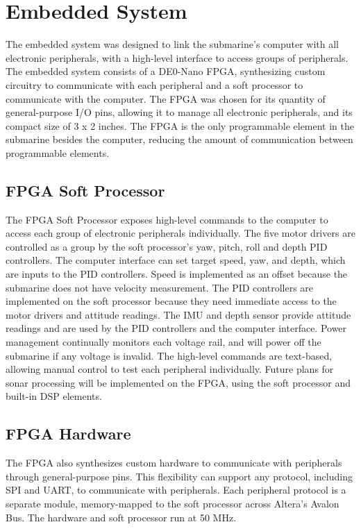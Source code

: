 \section{Embedded System}

The embedded system was designed to link the submarine's computer with all
electronic peripherals, with a high-level interface to access groups of peripherals.
The embedded system consists of a DE0-Nano FPGA, synthesizing custom circuitry to
communicate with each peripheral and a soft processor to communicate with the computer. The FPGA was chosen
for its quantity of general-purpose I/O pins, allowing it to manage all electronic peripherals,
and its compact size of 3 x 2 inches. The FPGA is the only programmable element in the submarine
besides the computer, reducing the amount of communication between programmable elements.

\subsection{FPGA Soft Processor}

The FPGA Soft Processor exposes high-level commands to the computer to access each group
of electronic peripherals individually. The five motor drivers are controlled as a group
by the soft processor's yaw, pitch, roll and depth PID controllers. The computer interface can set target
speed, yaw, and depth, which are inputs to the PID controllers. Speed is implemented as an offset
because the submarine does not have velocity measurement. The PID controllers are implemented on the
soft processor because they need immediate access to the motor drivers and attitude readings.
The IMU and depth sensor provide attitude readings and are used by the PID controllers and the
computer interface. Power management continually monitors each
voltage rail, and will power off the submarine if any voltage is invalid. The high-level commands are
text-based, allowing manual control to test each peripheral individually.
Future plans for sonar processing will be implemented on the FPGA, using the soft processor and
built-in DSP elements.

\subsection{FPGA Hardware}

The FPGA also synthesizes custom hardware to communicate with peripherals through general-purpose pins.
This flexibility can support any protocol, including SPI and UART, to communicate with peripherals.
Each peripheral protocol is a separate module, memory-mapped to the soft processor across Altera's
Avalon Bus. The hardware and soft processor run at 50 MHz.
